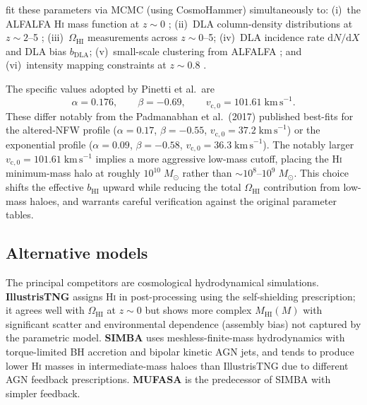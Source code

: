 \documentclass[10pt,a4paper]{article}
\newcommand{\Msun}{M_{\odot}}
\newcommand{\OmHI}{\Omega_{\mathrm{HI}}}
\newcommand{\bHI}{b_{\mathrm{HI}}}
\newcommand{\MHI}{M_{\mathrm{HI}}}
\newcommand{\vczero}{v_{\mathrm{c},0}}
\begin{document}
\citet{Padmanabhan2017} fit these parameters via MCMC (using CosmoHammer)
simultaneously to: (i)~the ALFALFA H\textsc{i} mass function at $z \sim 0$
\citep{Martin2010}; (ii)~DLA column-density distributions at $z \sim 2$--5
\citep{Noterdaeme2012,Crighton2015}; (iii)~$\OmHI$ measurements across
$z \sim 0$--5; (iv)~DLA incidence rate $\mathrm{d}N/\mathrm{d}X$ and DLA bias
$b_{\mathrm{DLA}}$; (v)~small-scale clustering from ALFALFA
\citep{Martin2012,Papastergis2013}; and (vi)~intensity mapping constraints at
$z \sim 0.8$ \citep{Switzer2013}.

The specific values adopted by Pinetti et al.\ are
\begin{equation}
  \alpha = 0.176, \qquad
  \beta  = -0.69, \qquad
  \vczero = 101.61\;\mathrm{km\,s}^{-1}.
\end{equation}
These differ notably from the Padmanabhan et al.\ (2017) published best-fits
for the altered-NFW profile ($\alpha = 0.17$, $\beta = -0.55$,
$\vczero = 37.2\;\mathrm{km\,s}^{-1}$) or the exponential profile
($\alpha = 0.09$, $\beta = -0.58$, $\vczero = 36.3\;\mathrm{km\,s}^{-1}$).
The notably larger $\vczero = 101.61\;\mathrm{km\,s}^{-1}$ implies a more
aggressive low-mass cutoff, placing the H\textsc{i} minimum-mass halo at
roughly $10^{10}\;\Msun$ rather than $\sim\!10^{8}$--$10^{9}\;\Msun$.  This
choice shifts the effective $\bHI$ upward while reducing the total $\OmHI$
contribution from low-mass haloes, and warrants careful verification against
the original parameter tables.


\subsection{Alternative models}

The principal competitors are cosmological hydrodynamical simulations.
\textbf{IllustrisTNG} \citep{VillaescusaNavarro2018} assigns H\textsc{i} in
post-processing using the \citet{Rahmati2013} self-shielding prescription; it
agrees well with $\OmHI$ at $z \sim 0$ but shows more complex $\MHI(M)$ with
significant scatter and environmental dependence (assembly bias) not captured
by the parametric model.  \textbf{SIMBA} \citep{Dave2019,Dave2020} uses
meshless-finite-mass hydrodynamics with torque-limited BH accretion and bipolar
kinetic AGN jets, and tends to produce lower H\textsc{i} masses in
intermediate-mass haloes than IllustrisTNG due to different AGN feedback
prescriptions.  \textbf{MUFASA} \citep{Dave2017} is the predecessor of SIMBA
with simpler feedback.
\end{document}
